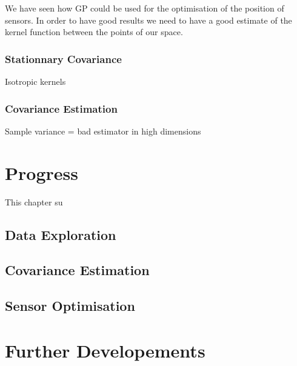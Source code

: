 \documentclass[12pt,twoside]{report}
\begin{document}
We have seen how GP could be used for the optimisation of the position of sensors. In order to have good results we need to have a good estimate of the kernel function between the points of our space. 



\subsection{Stationnary Covariance}

Isotropic kernels

\subsection{Covariance Estimation}

Sample variance = bad estimator in high dimensions










\chapter{Progress}

This chapter su

\section{Data Exploration}

\section{Covariance Estimation}

\section{Sensor Optimisation}


\cite{cressie_statistics_1991}
\cite{arcucci_effective_2018}

\chapter{Further Developements}




\end{document}
